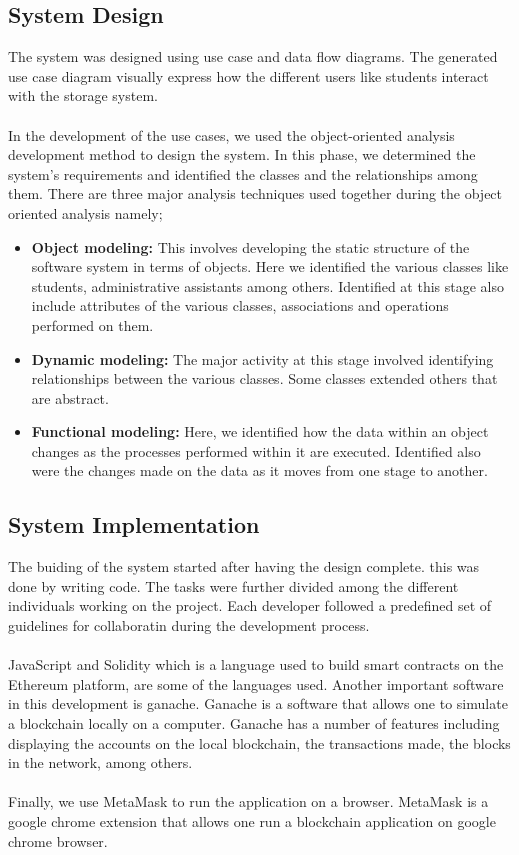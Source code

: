 \subsection{System Design}
The system was designed using use case and data flow diagrams. The generated use case diagram visually express how the different users like students interact with the storage system. \\~\\
In the development of the use cases, we used the object-oriented analysis development method to design the system. In this phase, we determined the system’s requirements and identified the classes and the relationships among them. There are three major analysis techniques used together during the object oriented analysis namely;
\begin{itemize}
\item \textbf{Object modeling:} This involves developing the static structure of the software system in terms of objects. Here we identified the various classes like students, administrative assistants among others. Identified at this stage also include attributes of the various classes, associations and operations performed on them.
\item \textbf{Dynamic modeling:} The major activity at this stage involved identifying relationships between the various classes. Some classes extended others that are abstract.  
\item \textbf{Functional modeling:} Here, we identified how the data within an object changes as the processes performed within it are executed. Identified also were the changes made on the data as it moves from one stage to another.
\end{itemize}

\subsection{System Implementation}
The buiding of the system started after having the design complete. this was done by writing code. The tasks were further divided among the different individuals working on the project.  Each developer followed a predefined set of guidelines for collaboratin during the development process. \\~\\

JavaScript and Solidity which is a language used to build smart contracts on the Ethereum platform, are some of the languages used.
Another important software in this development is ganache. Ganache is a software that allows one to simulate a blockchain locally on a computer. Ganache has a number of features including displaying the accounts on the local blockchain, the transactions made, the blocks in the network, among others.\\~\\
Finally, we use MetaMask to run the application on a browser. MetaMask is a google chrome extension that allows one run a blockchain application on google chrome browser. 

